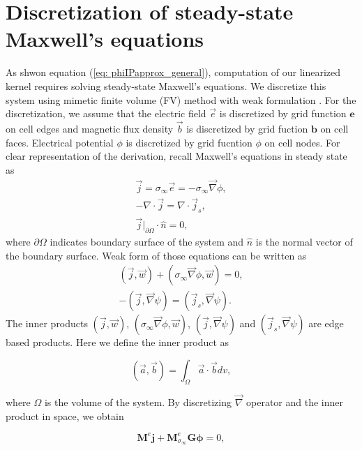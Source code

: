 \documentclass[extra,mreferee]{gji}
\renewcommand{\div}{\nabla\cdot}
\newcommand{\grad}{\vec \nabla}
\newcommand{\siginf}{\sigma_\infty}
\newcommand{\dgrad}{{\mathbf G}}
\newcommand{\M}{{\mathbf M}}
\newcommand{\MeSigInf}{{\M^e_{\sigma_\infty}}}
\newcommand{\Me}{{\M^e}}
\renewcommand {\j}  { {\vec j} }
\renewcommand {\b}  { {\vec b} }
\newcommand {\e}  { {\vec e} }
\renewcommand {\dj}  { {\mathbf{j} } }
\newcommand {\db}  { {\mathbf{b} } }
\newcommand {\de}  { {\mathbf{e} } }
\begin{document}
\appendix
\section{Discretization of steady-state Maxwell's equations}
\label{section:maxwell_discrete}
As shwon equation (\ref{eq: phiIPapprox_general}), computation of our linearized kernel requires solving steady-state Maxwell's equations. 
We discretize this system using mimetic finite volume (FV) method with weak formulation \cite[]{Eldadbook}. 
For the discretization, we assume that the electric field $\e$ is discretized by grid function $\de$ on cell edges and magnetic flux density $\b$ is discretized by grid fuction $\db$ on cell faces. 
Electrical potential $\phi$ is discretized by grid fucntion  $\phi$ on cell nodes. For clear representation of the derivation, recall Maxwell's equations in steady state as
\begin{align}
  \j = \siginf\e = -\siginf\grad \phi, \\
  -\div \j = \div \j_s, \\
  \j\big|_{\partial \Omega}\cdot\hat{n} = 0,
  \label{eq:DCBCneumann}
\end{align}
where $\partial \Omega$ indicates boundary surface of the system and $\hat{n}$ is the normal vector of the boundary surface. Weak form of those equations can be written as
\begin{align}
  (\j, \vec{w}) + (\siginf \grad \phi, \vec{w}) = 0, \\
  -(\j, \grad \psi) = (\j_s, \grad \psi).
\end{align}
The inner products $(\j, \vec{w})$, $(\siginf \grad \phi, \vec{w})$,  $(\j, \grad \psi)$ and $(\j_s, \grad \psi)$ are edge based products. Here we define the inner product as
\begin{linenomath*}
\begin{equation}
  (\vec{a}, \vec{b}) = \int_{\Omega} \vec{a}\cdot\vec{b} dv,
\end{equation}
\end{linenomath*}
where $\Omega$ is the volume of the system. By discretizing $\grad$ operator and the inner product in space, we obtain
\begin{linenomath*}
\begin{equation}
  \Me\dj + \MeSigInf\dgrad\boldsymbol{\phi} = 0,
  \label{eq:DCdisceq1}
\end{equation}
\end{linenomath*}
\end{document}
